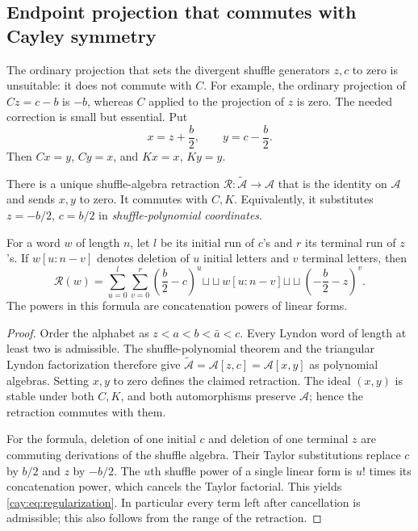 \subsection{Endpoint projection that commutes with Cayley symmetry}

The ordinary projection that sets the divergent shuffle generators
$z,c$ to zero is unsuitable: it does not commute with $C$.  For example,
the ordinary projection of $Cz=c-b$ is $-b$, whereas $C$ applied to
the projection of $z$ is zero.  The needed correction is small but
essential.  Put
\begin{equation}\label{cay:eq:shifted-endpoints}
 x=z+\frac b2,\qquad y=c-\frac b2.
\end{equation}
Then $Cx=y$, $Cy=x$, and $Kx=x$, $Ky=y$.

\begin{lemma}\label{cay:lem:regularization}
There is a unique shuffle-algebra retraction
$\mathcal R:\widetilde{\mathcal A}\to\mathcal A$ that is the identity
on $\mathcal A$ and sends $x,y$ to zero.  It commutes with $C,K$.
Equivalently, it substitutes $z=-b/2$, $c=b/2$ in
\emph{shuffle-polynomial coordinates}.

For a word $w$ of length $n$, let $l$ be its initial run of $c$'s and
$r$ its terminal run of $z$'s.  If $w[u:n-v]$ denotes deletion of
$u$ initial letters and $v$ terminal letters, then
\begin{equation}\label{cay:eq:regularization}
 \mathcal R(w)=
 \sum_{u=0}^{l}\sum_{v=0}^{r}
  \left(\frac b2-c\right)^u
  \mathbin{\sqcup\!\sqcup} w[u:n-v]
  \mathbin{\sqcup\!\sqcup}
  \left(-\frac b2-z\right)^v.
\end{equation}
The powers in this formula are concatenation powers of linear forms.
\end{lemma}

\begin{proof}
Order the alphabet as $z<a<b<\bar a<c$.  Every Lyndon word of length
at least two is admissible.  The shuffle-polynomial theorem
\cite{cay:Radford} and the
triangular Lyndon factorization therefore give
$\widetilde{\mathcal A}=\mathcal A[z,c]=\mathcal A[x,y]$ as polynomial
algebras.  Setting $x,y$ to zero defines the claimed retraction.  The
ideal $(x,y)$ is stable under both $C,K$, and both automorphisms preserve
$\mathcal A$; hence the retraction commutes with them.

For the formula, deletion of one initial $c$ and deletion of one terminal
$z$ are commuting derivations of the shuffle algebra.  Their Taylor
substitutions replace $c$ by $b/2$ and $z$ by $-b/2$.  The $u$th shuffle
power of a single linear form is $u!$ times its concatenation power,
which cancels the Taylor factorial.  This yields
\eqref{cay:eq:regularization}.  In particular every term left after
cancellation is admissible; this also follows from the range of the
retraction.
\end{proof}

